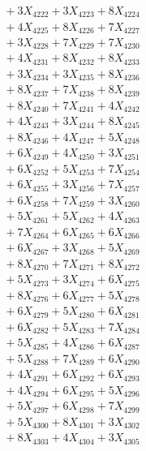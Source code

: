 \documentclass[a4paper,10pt]{article}
\begin{document}
{\begin{align}
&\;  + 3 X_{4222} + 3 X_{4223} + 8 X_{4224} \\[0.3ex]
&\;  + 4 X_{4225} + 8 X_{4226} + 7 X_{4227} \\[0.3ex]
&\;  + 3 X_{4228} + 7 X_{4229} + 7 X_{4230} \\[0.3ex]
&\;  + 4 X_{4231} + 8 X_{4232} + 8 X_{4233} \\[0.3ex]
&\;  + 3 X_{4234} + 3 X_{4235} + 8 X_{4236} \\[0.3ex]
&\;  + 8 X_{4237} + 7 X_{4238} + 8 X_{4239} \\[0.5ex]\allowbreak
&\;  + 8 X_{4240} + 7 X_{4241} + 4 X_{4242} \\[0.3ex]
&\;  + 4 X_{4243} + 3 X_{4244} + 8 X_{4245} \\[0.3ex]
&\;  + 8 X_{4246} + 4 X_{4247} + 5 X_{4248} \\[0.3ex]
&\;  + 6 X_{4249} + 4 X_{4250} + 3 X_{4251} \\[0.3ex]
&\;  + 6 X_{4252} + 5 X_{4253} + 7 X_{4254} \\[0.3ex]
&\;  + 6 X_{4255} + 3 X_{4256} + 7 X_{4257} \\[0.3ex]
&\;  + 6 X_{4258} + 7 X_{4259} + 3 X_{4260} \\[0.3ex]
&\;  + 5 X_{4261} + 5 X_{4262} + 4 X_{4263} \\[0.3ex]
&\;  + 7 X_{4264} + 6 X_{4265} + 6 X_{4266} \\[0.3ex]
&\;  + 6 X_{4267} + 3 X_{4268} + 5 X_{4269} \\[0.5ex]\allowbreak
&\;  + 8 X_{4270} + 7 X_{4271} + 8 X_{4272} \\[0.3ex]
&\;  + 5 X_{4273} + 3 X_{4274} + 6 X_{4275} \\[0.3ex]
&\;  + 8 X_{4276} + 6 X_{4277} + 5 X_{4278} \\[0.3ex]
&\;  + 6 X_{4279} + 5 X_{4280} + 6 X_{4281} \\[0.3ex]
&\;  + 6 X_{4282} + 5 X_{4283} + 7 X_{4284} \\[0.3ex]
&\;  + 5 X_{4285} + 4 X_{4286} + 6 X_{4287} \\[0.3ex]
&\;  + 5 X_{4288} + 7 X_{4289} + 6 X_{4290} \\[0.3ex]
&\;  + 4 X_{4291} + 6 X_{4292} + 6 X_{4293} \\[0.3ex]
&\;  + 4 X_{4294} + 6 X_{4295} + 5 X_{4296} \\[0.3ex]
&\;  + 5 X_{4297} + 6 X_{4298} + 7 X_{4299} \\[0.5ex]\allowbreak
&\;  + 5 X_{4300} + 8 X_{4301} + 3 X_{4302} \\[0.3ex]
&\;  + 8 X_{4303} + 4 X_{4304} + 3 X_{4305} \\[0.3ex]

\end{align}}
\end{document}
